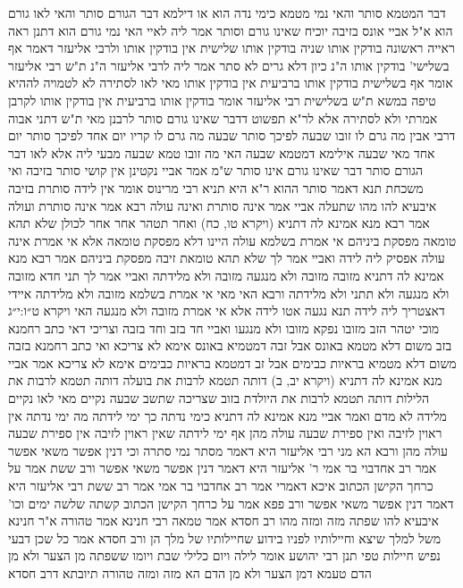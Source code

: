 \documentclass[12pt, openany]{book}
\begin{document}
{דבר המטמא סותר והאי נמי מטמא כימי נדה הוא או דילמא  דבר הגורם סותר והאי לאו גורם הוא 
א"ל אביי  אונס בזיבה יוכיח שאינו גורם וסותר 
אמר ליה  לאיי האי נמי גורם הוא  דתנן ראה ראייה ראשונה בודקין אותו שניה בודקין אותו שלישית אין בודקין אותו 
ולרבי אליעזר דאמר אף בשלישי' בודקין אותו ה"נ כיון דלא גרים לא סתר  אמר ליה  לרבי אליעזר ה"נ 
ת"ש רבי אליעזר אומר  אף בשלישית בודקין אותו ברביעית אין בודקין אותו  מאי לאו לסתירה 
לא לטמויה לההיא טיפה במשא 
ת"ש בשלישית רבי אליעזר אומר  בודקין אותו ברביעית אין בודקין אותו לקרבן אמרתי ולא לסתירה 
אלא לר"א תפשוט דדבר שאינו גורם סותר לרבנן מאי 
ת"ש דתני אבוה דרבי אבין  מה גרם לו זובו שבעה לפיכך סותר שבעה מה גרם לו קריו יום אחד לפיכך סותר יום אחד 
מאי שבעה  אילימא דמטמא שבעה האי מה זובו טמא שבעה מבעי ליה אלא לאו  דבר הגורם סותר דבר שאינו גורם אינו סותר ש"מ 
אמר אביי  נקטינן אין קושי סותר בזיבה  ואי משכחת תנא דאמר סותר ההוא ר"א היא 
תניא רבי מרינוס אומר  אין לידה סותרת בזיבה  איבעיא להו  מהו שתעלה  אביי אמר  אינה סותרת ואינה עולה  רבא אמר  אינה סותרת ועולה 
אמר רבא  מנא אמינא לה דתניא (ויקרא טו, כח) ואחר תטהר אחר אחר לכולן שלא תהא טומאה מפסקת ביניהם 
אי אמרת בשלמא עולה היינו דלא מפסקת טומאה אלא אי אמרת אינה עולה אפסיק ליה לידה  ואביי אמר לך  שלא תהא טומאת זיבה מפסקת ביניהם 
אמר רבא  מנא אמינא לה דתניא מזובה מזובה ולא מנגעה מזובה ולא מלידתה  ואביי אמר לך  תני חדא מזובה ולא מנגעה ולא תתני ולא מלידתה 
ורבא האי מאי  אי אמרת בשלמא מזובה ולא מלידתה איידי דאצטריך ליה לידה תנא נגעה אטו לידה אלא אי אמרת מזובה ולא מנגעה האי {ויקרא ט״ו:י״ג } מוכי יטהר הזב מזובו נפקא מזובו ולא מנגעו 
ואביי חד בזב וחד בזבה  וצריכי דאי כתב רחמנא
בזב משום דלא מטמא באונס אבל זבה דמטמיא באונס אימא לא צריכא 
ואי כתב רחמנא בזבה משום דלא מטמיא בראיות כבימים אבל זב דמטמא בראיות כבימים אימא לא צריכא 
אמר אביי  מנא אמינא לה דתניא  (ויקרא יב, ב) דותה תטמא לרבות את בועלה
דותה תטמא לרבות את הלילות דותה תטמא לרבות את היולדת בזוב שצריכה שתשב שבעה נקיים 
מאי לאו נקיים מלידה  לא מדם 
ואמר אביי  מנא אמינא לה דתניא  כימי נדתה כך ימי לידתה מה ימי נדתה אין ראוין לזיבה ואין ספירת שבעה עולה מהן אף ימי לידתה שאין ראוין לזיבה אין ספירת שבעה עולה מהן 
ורבא הא מני רבי אליעזר היא דאמר מסתר נמי סתרה 
וכי דנין אפשר משאי אפשר 
אמר רב אחדבוי בר אמי  ר' אליעזר היא דאמר דנין אפשר משאי אפשר  ורב ששת אמר  על כרחך הקישן הכתוב  איכא דאמרי אמר רב אחדבוי בר אמי אמר רב ששת  רבי אליעזר היא דאמר דנין אפשר משאי אפשר ורב פפא אמר  על כרחך הקישן הכתוב
קשתה שלשה ימים וכו'
איבעיא להו  שפתה מזה ומזה מהו  רב חסדא אמר  טמאה רבי חנינא אמר  טהורה 
א"ר חנינא  משל למלך שיצא וחיילותיו לפניו בידוע שחיילותיו של מלך הן 
ורב חסדא אמר  כל שכן דבעי נפיש חיילות טפי 
תנן רבי יהושע אומר  לילה ויום כלילי שבת ויומו ששפתה מן הצער ולא מן הדם  טעמא דמן הצער ולא מן הדם הא מזה ומזה טהורה  תיובתא דרב חסדא 
}
\end{document}
